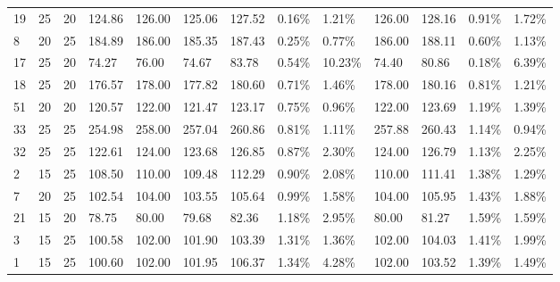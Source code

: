 \begin{longtable}{l|ll|ll|llll|llll}
  19 & 25                         & 20                         & 124.86                    & 126.00        & 125.06 & 127.52 & 0.16\%  & 1.21\%  & 126.00 & 128.16 & 0.91\%  & 1.72\%  \\
  8  & 20                         & 25                         & 184.89                    & 186.00        & 185.35 & 187.43 & 0.25\%  & 0.77\%  & 186.00 & 188.11 & 0.60\%  & 1.13\%  \\
  17 & 25                         & 20                         & 74.27                     & 76.00         & 74.67  & 83.78  & 0.54\%  & 10.23\% & 74.40  & 80.86  & 0.18\%  & 6.39\%  \\
  18 & 25                         & 20                         & 176.57                    & 178.00        & 177.82 & 180.60 & 0.71\%  & 1.46\%  & 178.00 & 180.16 & 0.81\%  & 1.21\%  \\
  51 & 20                         & 20                         & 120.57                    & 122.00        & 121.47 & 123.17 & 0.75\%  & 0.96\%  & 122.00 & 123.69 & 1.19\%  & 1.39\%  \\
  33 & 25                         & 25                         & 254.98                    & 258.00        & 257.04 & 260.86 & 0.81\%  & 1.11\%  & 257.88 & 260.43 & 1.14\%  & 0.94\%  \\
  32 & 25                         & 25                         & 122.61                    & 124.00        & 123.68 & 126.85 & 0.87\%  & 2.30\%  & 124.00 & 126.79 & 1.13\%  & 2.25\%  \\
  2  & 15                         & 25                         & 108.50                    & 110.00        & 109.48 & 112.29 & 0.90\%  & 2.08\%  & 110.00 & 111.41 & 1.38\%  & 1.29\%  \\
  7  & 20                         & 25                         & 102.54                    & 104.00        & 103.55 & 105.64 & 0.99\%  & 1.58\%  & 104.00 & 105.95 & 1.43\%  & 1.88\%  \\
  21 & 15                         & 20                         & 78.75                     & 80.00         & 79.68  & 82.36  & 1.18\%  & 2.95\%  & 80.00  & 81.27  & 1.59\%  & 1.59\%  \\
  3  & 15                         & 25                         & 100.58                    & 102.00        & 101.90 & 103.39 & 1.31\%  & 1.36\%  & 102.00 & 104.03 & 1.41\%  & 1.99\%  \\
  1  & 15                         & 25                         & 100.60                    & 102.00        & 101.95 & 106.37 & 1.34\%  & 4.28\%  & 102.00 & 103.52 & 1.39\%  & 1.49\%  \\

\end{longtable}
